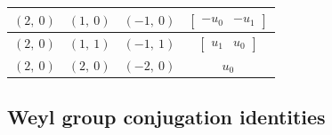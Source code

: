 \documentclass[11pt]{article}
\theoremstyle{definition}
\begin{document}
\begin{longtable}{|l|l|l|c|}
    \hline
    $\left( 2, \  0\right)$ & $\left( 1, \  0\right)$ & $\left( -1, \  0\right)$ & $\left[\begin{matrix}- u_{0} & - u_{1}\end{matrix}\right]$ \\
    \hline
    $\left( 2, \  0\right)$ & $\left( 1, \  1\right)$ & $\left( -1, \  1\right)$ & $\left[\begin{matrix}u_{1} & u_{0}\end{matrix}\right]$ \\
    \hline
    $\left( 2, \  0\right)$ & $\left( 2, \  0\right)$ & $\left( -2, \  0\right)$ & $u_{0}$ \\
    \hline
\end{longtable}


\subsection{Weyl group conjugation identities}
\end{document}
